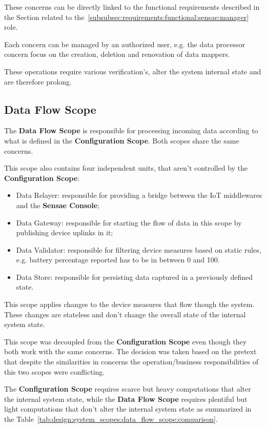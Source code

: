 These concerns can be directly linked to the functional requirements described in the Section related to the~\ref{subsubsec:requirements:functional:sensae:manager} role.

Each concern can be managed by an authorized user, e.g. the data processor concern focus on the creation, deletion and renovation of data mappers.

These operations require various verification's, alter the system internal state and are therefore prolong.

\subsection{Data Flow Scope}
\label{subsec:design:system_scopes:data_flow_scope}

The \textbf{Data Flow Scope} is responsible for processing incoming data according to what is defined in the \textbf{Configuration Scope}. Both scopes share the same concerns.

This scope also contains four independent units, that aren't controlled by the \textbf{Configuration Scope}:

\begin{itemize}
   \item Data Relayer: responsible for providing a bridge between the \gls{IoT} middlewares and the \textbf{Sensae Console};
   \item Data Gateway: responsible for starting the flow of data in this scope by publishing device uplinks in it;
   \item Data Validator: responsible for filtering device measures based on static rules, e.g. battery percentage reported has to be in between 0 and 100.
   \item Data Store: responsible for persisting data captured in a previously defined state.
\end{itemize}

This scope applies changes to the device measures that flow though the system. These changes are stateless and don't change the overall state of the internal system state.

This scope was decoupled from the \textbf{Configuration Scope} even though they both work with the same concerns. The decision was taken based on the pretext that despite the similarities in concerns the operation/business responsibilities of this two scopes were conflicting.

The \textbf{Configuration Scope} requires scarce but heavy computations that alter the internal system state, while the \textbf{Data Flow Scope} requires plentiful but light computations that don't alter the internal system state as summarized in the Table~\ref{tab:design:system_scopes:data_flow_scope:comparison}.

